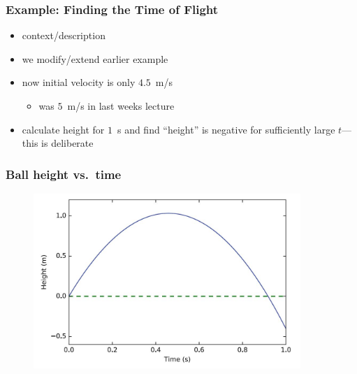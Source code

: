 \documentclass[english,14pt]{beamer}
\begin{document}
\begin{frame}[fragile]

\frametitle{Example: Finding the Time of Flight}

\begin{itemize}
	\item context/description
	\item we modify/extend earlier example
	\item now initial velocity is only $4.5$~m/s
	\begin{itemize}
		\item was $5$~m/s in last weeks lecture
	\end{itemize}
	\item calculate height for $1$~s and find ``height'' is negative for sufficiently large $t$---this is deliberate
\end{itemize}


\end{frame}


\begin{frame}[fragile]

\frametitle{Ball height vs.\ time}

\begin{figure}[ht]
	\centering
	\includegraphics[width=0.9\textwidth]{figures/LLp66output}
\end{figure}

\end{frame}
\end{document}
